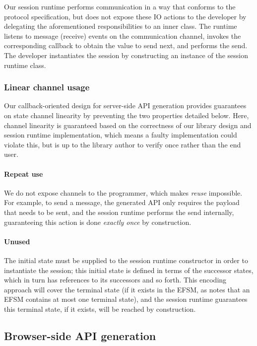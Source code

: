 \documentclass[submission,copyright,creativecommons]{eptcs}
\begin{document}
Our session runtime performs communication in a way that conforms to the protocol specification, but does not expose these IO actions to the developer by delegating the aforementioned responsibilities to an inner class. The runtime listens to message (receive) events on the communication channel, invokes the corresponding callback to obtain the value to send next, and performs the send. The developer instantiates the session by constructing an instance of the session runtime class.

\subsubsection{Linear channel usage}
\label{section:serverlinear}
Our callback-oriented design for server-side API generation provides guarantees on state channel linearity by preventing the two properties detailed below. Here, channel linearity is guaranteed based on the correctness of our library design and session runtime implementation, which means a faulty implementation could violate this, but is up to the library author to verify once rather than the end user.

\paragraph{Repeat use} We do not expose channels to the programmer, which makes \textit{reuse} impossible. For example, to send a message, the generated API only requires the payload that needs to be sent, and the session runtime performs the send internally, guaranteeing this action is done \textit{exactly once} by construction.

\paragraph{Unused} The initial state must be supplied to the session runtime constructor in order to instantiate the session; this initial state is defined in terms of the successor states, which in turn has references to its successors and so forth. This encoding approach will cover the terminal state (if it exists in the EFSM, as \cite{Hybrid2016} notes that an EFSM contains at most one terminal state), and the session runtime guarantees this terminal state, if it exists, will be reached by construction. 

\subsection{Browser-side API generation}
\label{section:browser}
\end{document}
